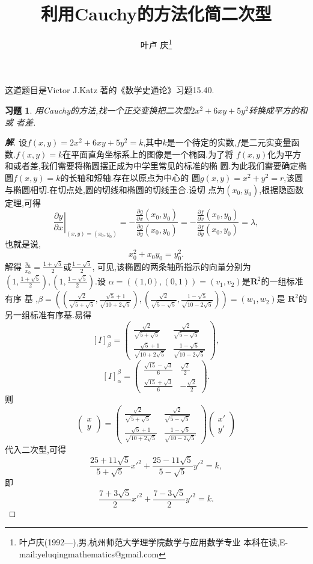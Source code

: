 ﻿\documentclass[a4paper]{article}
\newtheorem*{exa}{习题}
\newenvironment{example}
{\bigskip\begin{mdframed}\begin{exa}}
    {\end{exa}\end{mdframed}\bigskip}
\newcommand{\pa}{\partial} \newcommand{\Om}{\Omega}
\begin{document}
\title{\huge{\bf{利用Cauchy的方法化简二次型}}} \author{\small{叶卢
    庆\footnote{叶卢庆(1992---),男,杭州师范大学理学院数学与应用数学专业
      本科在读,E-mail:yeluqingmathematics@gmail.com}}}
\maketitle\ni
这道题目是Victor J.Katz 著的《数学史通论》习题15.40.
\begin{example}
  用Cauchy的方法,找一个正交变换把二次型$2x^2+6xy+5y^2$转换成平方的和或
  者差.
\end{example}
\begin{proof}[\textbf{解}]
  设$f(x,y)=2x^2+6xy+5y^2=k$,其中$k$是一个待定的实数,$f$是二元实变量函
  数.$f(x,y)=k$在平面直角坐标系上的图像是一个椭圆.为了将
  $f(x,y)$化为平方和或者差,我们需要将椭圆摆正成为中学里常见的标准的椭
  圆.为此我们需要确定椭圆$f(x,y)=k$的长轴和短轴.存在以原点为中心的
  圆$g(x,y)=x^2+y^2=r$,该圆与椭圆相切.在切点处,圆的切线和椭圆的切线重合.设切
  点为$(x_{0},y_{0})$,根据隐函数定理,可得
$$
\left.\frac{\pa y}{\pa x}\right|_{(x,y)=(x_0,y_0)}=-\frac{\frac{\pa g}{\pa x}(x_{0},y_{0})}{\frac{\pa g}{\pa y}(x_0,y_0)}=-\frac{\frac{\pa f}{\pa x}(x_{0},y_{0})}{\frac{\pa f}{\pa y}(x_0,y_0)}=\lambda,
$$
也就是说,
$$
x_0^2+x_0y_0=y_0^2.
$$
解得 $\frac{y_0}{x_0}=\frac{1+\sqrt{5}}{2}$或$\frac{1-\sqrt{5}}{2}$,
可见,该椭圆的两条轴所指示的向量分别为
$(1,\frac{1+\sqrt{5}}{2}),(1,\frac{1-\sqrt{5}}{2})$.设
$\alpha=((1,0),(0,1))=(v_1,v_2)$是$\mathbf{R}^2$的一组标准有序
基
,$\beta=((\frac{\sqrt{2}}{\sqrt{5+\sqrt{5}}},\frac{\sqrt{5}+1}{\sqrt{10+2
  \sqrt{5}}}),(\frac{\sqrt{2}}{\sqrt{5-\sqrt{5}}},\frac{1-\sqrt{5}}{\sqrt{10-2
\sqrt{5}}}))=(w_1,w_2)$是
$\mathbf{R}^2$的另一组标准有序基.易得
$$
[I]_{\beta}^{\alpha}=
\begin{pmatrix}
  \frac{\sqrt{2}}{\sqrt{5+\sqrt{5}}}&\frac{\sqrt{2}}{\sqrt{5-\sqrt{5}}}\\
\frac{\sqrt{5}+1}{\sqrt{10+2
  \sqrt{5}}}&\frac{1-\sqrt{5}}{\sqrt{10-2
\sqrt{5}}}
\end{pmatrix},
$$
$$
[I]_{\alpha}^{\beta}=
\begin{pmatrix}
  \frac{\sqrt{15}-\sqrt{3}}{6}&\frac{\sqrt{2}}{2}\\
\frac{\sqrt{15}+\sqrt{3}}{6}&-\frac{\sqrt{2}}{2}
\end{pmatrix}.
$$
则
$$
\begin{pmatrix}
  x\\
y
\end{pmatrix}=\begin{pmatrix}
  \frac{\sqrt{2}}{\sqrt{5+\sqrt{5}}}&\frac{\sqrt{2}}{\sqrt{5-\sqrt{5}}}\\
\frac{\sqrt{5}+1}{\sqrt{10+2
  \sqrt{5}}}&\frac{1-\sqrt{5}}{\sqrt{10-2
\sqrt{5}}}
\end{pmatrix}
\begin{pmatrix}
  x'\\
y'
\end{pmatrix}
$$
代入二次型,可得
$$
\frac{25+11 \sqrt{5}}{5+\sqrt{5}}x'^2+\frac{25-11 \sqrt{5}}{5-\sqrt{5}}y'^2=k,
$$
即
$$
\frac{7+3 \sqrt{5}}{2}x'^2+\frac{7-3 \sqrt{5}}{2}y'^2=k.
$$
\end{proof}
\end{document}
